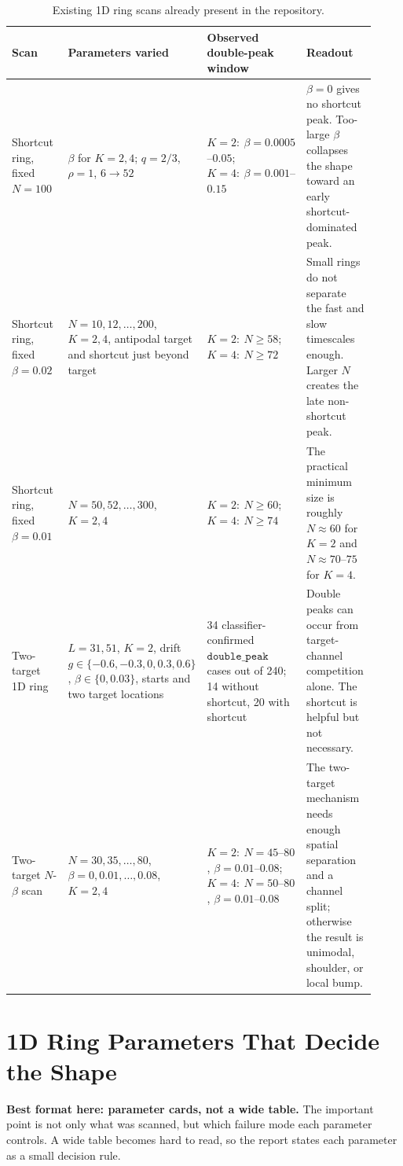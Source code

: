 \documentclass[11pt]{article}
\begin{document}
\begin{table}[htbp]
\centering
\small
\begin{tabular}{p{0.24\linewidth}p{0.24\linewidth}p{0.21\linewidth}p{0.23\linewidth}}
\toprule
Scan & Parameters varied & Observed double-peak window & Readout \\
\midrule
Shortcut ring, fixed \(N=100\) &
\(\beta\) for \(K=2,4\); \(q=2/3\), \(\rho=1\), \(6\to52\) &
\(K=2:\ \beta=0.0005\)--\(0.05\);
\(K=4:\ \beta=0.001\)--\(0.15\) &
\(\beta=0\) gives no shortcut peak. Too-large \(\beta\) collapses the shape
toward an early shortcut-dominated peak. \\
\midrule
Shortcut ring, fixed \(\beta=0.02\) &
\(N=10,12,\ldots,200\), \(K=2,4\), antipodal target and shortcut just beyond target &
\(K=2:\ N\ge58\);
\(K=4:\ N\ge72\) &
Small rings do not separate the fast and slow timescales enough. Larger \(N\)
creates the late non-shortcut peak. \\
\midrule
Shortcut ring, fixed \(\beta=0.01\) &
\(N=50,52,\ldots,300\), \(K=2,4\) &
\(K=2:\ N\ge60\);
\(K=4:\ N\ge74\) &
The practical minimum size is roughly \(N\approx60\) for \(K=2\) and
\(N\approx70\)--\(75\) for \(K=4\). \\
\midrule
Two-target 1D ring &
\(L=31,51\), \(K=2\), drift \(g\in\{-0.6,-0.3,0,0.3,0.6\}\),
\(\beta\in\{0,0.03\}\), starts and two target locations &
34 classifier-confirmed \(\texttt{double\_peak}\) cases out of 240;
14 without shortcut, 20 with shortcut &
Double peaks can occur from target-channel competition alone. The shortcut
is helpful but not necessary. \\
\midrule
Two-target \(N\)-\(\beta\) scan &
\(N=30,35,\ldots,80\), \(\beta=0,0.01,\ldots,0.08\), \(K=2,4\) &
\(K=2:\ N=45\)--\(80\), \(\beta=0.01\)--\(0.08\);
\(K=4:\ N=50\)--\(80\), \(\beta=0.01\)--\(0.08\) &
The two-target mechanism needs enough spatial separation and a channel split;
otherwise the result is unimodal, shoulder, or local bump. \\
\bottomrule
\end{tabular}
\caption{Existing 1D ring scans already present in the repository.}
\end{table}

\section*{1D Ring Parameters That Decide the Shape}

\textbf{Best format here: parameter cards, not a wide table.}
The important point is not only what was scanned, but which failure mode each
parameter controls. A wide table becomes hard to read, so the report states
each parameter as a small decision rule.
\end{document}
